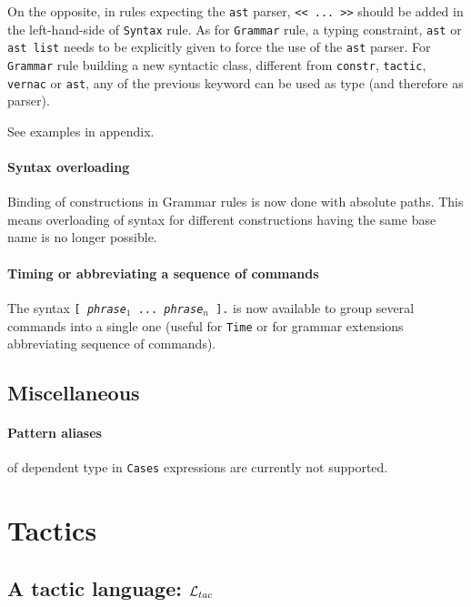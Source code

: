 \documentclass[11pt]{article}
\begin{document}
On the opposite, in rules expecting the {\tt ast} parser,
{\verb:<< ... >>:} should be added in the left-hand-side of {\tt Syntax} rule.
As for {\tt Grammar} rule, a typing constraint, {\tt ast} or {\tt ast
list} needs to be explicitly given to force the use of the {\tt ast}
parser. For {\tt Grammar} rule building a new syntactic class,
different from {\tt constr}, {\tt tactic}, {\tt vernac} or {\tt ast},
any of the previous keyword can be used as type (and therefore as
parser).

See examples in appendix.

\paragraph{Syntax overloading}

 Binding of constructions in Grammar rules is now done with absolute
  paths. This means overloading of syntax for different constructions
  having the same base name is no longer possible.

\paragraph{Timing or abbreviating a sequence of commands}

The syntax {\tt [ {\it phrase$_1$} ... {\it phrase$_n$} ].} is now
available to group several commands into a single one (useful for
{\tt Time} or for grammar extensions abbreviating sequence of commands).

\subsection{Miscellaneous}

\paragraph{Pattern aliases} of dependent type in \verb=Cases=
expressions are currently not supported.

\section{Tactics}
\label{Tactics}
\def\oc{{\sf Objective~Caml}}

\subsection{A tactic language: ${\cal L}_{tac}$}
\end{document}
